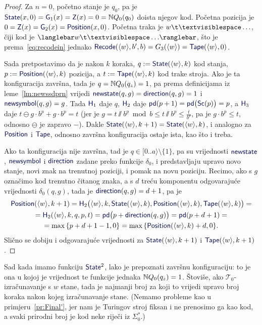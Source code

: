 \begin{proof}
Za $n=0$, početno stanje je $q_0$, pa je $\f{State}(x,0)=\f G_1(x)=\f Z(x)=0=\N Q_0(q_0)$ doista njegov kod. Početna pozicija je $0=\f Z(x)=\f G_2(x)=\f{Position}(x,0)$. Početna traka je $w\bl\ldots$, čiji kod je $\knk{w\bl\ldots}$, što je prema~\eqref{eq:recodein} jednako $\f{Recode}(\kr w,b',b)=G_3(\kr w)=\f{Tape}(\kr w,0)$.

Sada pretpostavimo da je nakon $k$ koraka, $q:=\f{State}(\kr w,k)$ kod stanja, $p:=\f{Position}(\kr w,k)$ pozicija, a $t:=\f{Tape}(\kr w,k)$ kod trake stroja. Ako je ta konfiguracija završna, tada je $q={\mathbb N} Q_0(q_z)=1$, pa prema definicijama iz leme~\ref{lm:newssdprn} vrijedi $\f{newstate}(q,g)=\f{direction}(q,g)=1$ i $\f{newsymbol}(q,g)=g$. Tada $\f H_1$ daje $q$, $\f H_2$ daje $\f{pd}(p+1)=\f{pd}\bigl(\f{Sc}(p)\bigr)=p$, a $\f H_3$ daje $t\ominus g\cdot b^p+g\cdot b^p=t$ (jer je $g=t\sslash b^p\bmod b\le t\sslash b^p\le\frac{t}{b^p}$, pa je $g\cdot b^p\le t$, odnosno $\ominus$ je zapravo $-$). Dakle $\f{State}(\kr w,k+1)=\f{State}(\kr w,k)$, i analogno za $\f{Position}$ i $\f{Tape}$, odnosno završna konfiguracija ostaje ista, kao što i treba.

Ako ta konfiguracija nije završna, tad je $q\in[0..a\rangle\setminus\{1\}$, pa su vrijednosti $\f{newstate}$, $\f{newsymbol}$ i $\f{direction}$ zadane preko funkcije $\delta_0$, i predstavljaju upravo novo stanje, novi znak na trenutnoj poziciji, i pomak na novu poziciju. Recimo, ako s $g$ označimo kod trenutno čitanog znaka, a s $d$ treću komponentu odgovarajuće vrijednosti $\delta_0(q,g)$, tada je $\f{direction}(q,g)=d+1$, pa je
\begin{multline}
    \f{Position}(\kr w,k+1)=\f H_2\bigl(\kr w,k,\f{State}(\kr w,k),\f{Position}(\kr w, k),\f{Tape}(\kr w,k)\bigr)=\\
    =\f H_2(\kr w,k,q,p,t)=
    \f{pd}\bigl(p+\f{direction}(q,g)\bigr)=\f{pd}(p+d+1)=\\
    =\max\,\{p+d+1-1,0\}=\max\,\{\f{Position}(\kr w,k)+d,0\}\text.
\end{multline}
Slično se dobiju i odgovarajuće vrijednosti za $\f{State}(\kr w,k+1)$ i $\f{Tape}(\kr w,k+1)$.
\end{proof}


Sad kada imamo funkciju $\f{State}^2$, lako je prepoznati završnu konfiguraciju: to je ona u kojoj je vrijednost te funkcije jednaka ${\mathbb N} Q_0(q_z)=1$. Štoviše, ako $\mathcal T_0$-izračunavanje s $w$ stane, tada je najmanji broj za koji to vrijedi upravo broj koraka nakon kojeg izračunavanje stane. (Nemamo probleme kao u primjeru~\ref{pr:Final'}, jer nam je Turingov stroj fiksan i ne prenosimo ga kao kod, a svaki prirodni broj je kod neke riječi iz $\Sigma_0^*$.)

